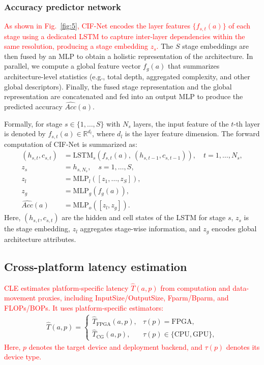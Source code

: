 \documentclass[a4paper,fleqn]{cas-sc}
\begin{document}
\subsubsection{Accuracy predictor network} 
\textcolor{red}{As shown in Fig.~\ref{fig:5}, CIF-Net encodes the layer features $\{f_{s,t}(a)\}$ of each stage using a dedicated LSTM to capture inter-layer dependencies within the same resolution, producing a stage embedding $z_s$.}
The $S$ stage embeddings are then fused by an MLP to obtain a holistic representation of the architecture.
In parallel, we compute a global feature vector $f_g(a)$ that summarizes architecture-level statistics (e.g., total depth, aggregated complexity, and other global descriptors).
Finally, the fused stage representation and the global representation are concatenated and fed into an output MLP to produce the predicted accuracy $\widehat{Acc}(a)$.

Formally, for stage $s\in\{1,\dots,S\}$ with $N_s$ layers, the input feature of the $t$-th layer is denoted by $f_{s,t}(a)\in\mathbb{R}^{d_l}$, where $d_l$ is the layer feature dimension.
The forward computation of CIF-Net is summarized as:
\begin{align}
(h_{s,t},c_{s,t}) &= \mathrm{LSTM}_s\!\left(f_{s,t}(a),~(h_{s,t-1},c_{s,t-1})\right), \quad t=1,\dots,N_s, \label{eq:cif_lstm}\\
z_s &= h_{s,N_s}, \quad s=1,\dots,S, \label{eq:cif_stage}\\
z_l &= \mathrm{MLP}_l\!\left([z_1,\dots,z_S]\right), \label{eq:cif_fuse}\\
z_g &= \mathrm{MLP}_g\!\left(f_g(a)\right), \label{eq:cif_global}\\
\widehat{Acc}(a) &= \mathrm{MLP}_o\!\left([z_l, z_g]\right). \label{eq:cif_out}
\end{align}
Here, $(h_{s,t},c_{s,t})$ are the hidden and cell states of the LSTM for stage $s$, $z_s$ is the stage embedding, $z_l$ aggregates stage-wise information, and $z_g$ encodes global architecture attributes.

\subsection{Cross-platform latency estimation}\label{sec:cle}
\textcolor{red}{CLE estimates platform-specific latency $\hat{T}(a,p)$ from computation and data-movement proxies, including InputSize/OutputSize, Fparm/Bparm, and FLOPs/BOPs. It uses platform-specific estimators:}
\begin{align}
\hat{T}(a,p)=
\begin{cases}
\hat{T}_{\mathrm{FPGA}}(a,p), & \tau(p)=\mathrm{FPGA},\\
\hat{T}_{\mathrm{CG}}(a,p),   & \tau(p)\in\{\mathrm{CPU},\mathrm{GPU}\},
\end{cases}
\label{eq:cle_piecewise}
\end{align}
\textcolor{red}{Here, $p$ denotes the target device and deployment backend, and $\tau(p)$ denotes its device type.}
\end{document}
